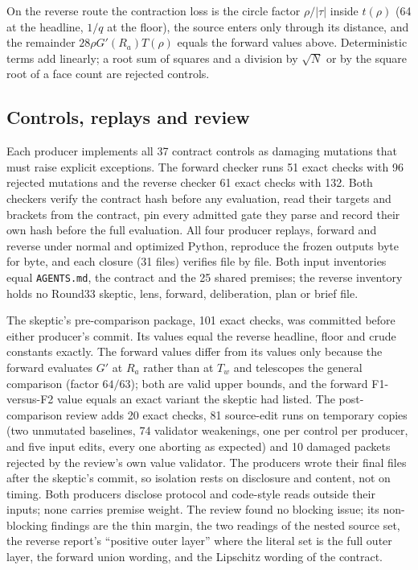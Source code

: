 On the reverse route the contraction loss is the circle factor
$\rho/|\tau|$ inside $t(\rho)$ (64 at the headline, $1/q$ at the floor), the
source enters only through its distance, and the remainder
$28\rho G'(R_a)T(\rho)$ equals the forward values above. Deterministic terms
add linearly; a root sum of squares and a division by $\sqrt N$ or by the
square root of a face count are rejected controls.

\subsection{Controls, replays and review}
\label{sec:ba1-evidence}
Each producer implements all 37 contract controls as damaging mutations that
must raise explicit exceptions. The forward checker runs 51 exact checks with
96 rejected mutations and the reverse checker 61 exact checks with 132. Both
checkers verify the contract hash before any evaluation, read their targets
and brackets from the contract, pin every admitted gate they parse and record
their own hash before the full evaluation. All four producer replays, forward
and reverse under normal and optimized Python, reproduce the frozen outputs
byte for byte, and each closure (31 files) verifies file by file. Both input
inventories equal \texttt{AGENTS.md}, the contract and the 25 shared premises;
the reverse inventory holds no Round33 skeptic, lens, forward, deliberation,
plan or brief file.

The skeptic's pre-comparison package, 101 exact checks, was committed before
either producer's commit. Its values equal the reverse headline, floor and
crude constants exactly. The forward values differ from its values only
because the forward evaluates $G'$ at $R_a$ rather than at $T_w$ and
telescopes the general comparison (factor $64/63$); both are valid upper
bounds, and the forward F1-versus-F2 value equals an exact variant the skeptic
had listed. The post-comparison review adds 20 exact checks, 81 source-edit
runs on temporary copies (two unmutated baselines, 74 validator weakenings,
one per control per producer, and five input edits, every one aborting as
expected) and 10 damaged packets rejected by the review's own value
validator. The producers wrote their final files after the skeptic's commit,
so isolation rests on disclosure and content, not on timing. Both producers
disclose protocol and code-style reads outside their inputs; none carries
premise weight. The review found no blocking issue; its non-blocking findings
are the thin margin, the two readings of the nested source set, the reverse
report's ``positive outer layer'' where the literal set is the full outer
layer, the forward union wording, and the Lipschitz wording of the contract.

